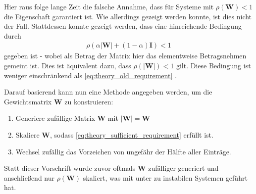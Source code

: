 Hier raus folge lange Zeit die falsche Annahme, dass für Systeme mit $\rho(\mathbf{W}) < 1$ die Eigenschaft garantiert ist. Wie allerdings gezeigt werden konnte, ist dies nicht der Fall. Stattdessen konnte gezeigt werden, dass eine hinreichende Bedingung durch
\begin{align}
\label{eq:theory_sufficient_requirement}
\rho(\alpha |\mathbf{W}|+(1-\alpha) \mathbf{I}) < 1
\end{align}
gegeben ist \cite{yildiz} - wobei als Betrag der Matrix hier das elementweise Betragsnehmen gemeint ist. Dies ist äquivalent dazu, dass $\rho(|\mathbf{W}|) < 1$ gilt. Diese Bedingung ist weniger einschränkend als \ref{eq:theory_old_requirement} \cite{yildiz}. 

Darauf basierend kann nun eine Methode angegeben werden, um die Gewichtsmatrix $\mathbf{W}$ zu konstruieren:

\singlespacing
\begin{enumerate}
\item Generiere zufällige Matrix $\mathbf{W}$ mit $\mathbf{|W|} = \mathbf{W}$
\item Skaliere $\mathbf{W}$, sodass \ref{eq:theory_sufficient_requirement} erfüllt ist.
\item Wechsel zufällig das Vorzeichen von ungefähr der Hälfte aller Einträge.
\end{enumerate}
\onehalfspacing

Statt dieser Vorschrift wurde zuvor oftmals $\mathbf{W}$ zufälliger generiert und anschließend nur $\rho(\mathbf{W})$ skaliert, was mit unter zu instabilen Systemen geführt hat.